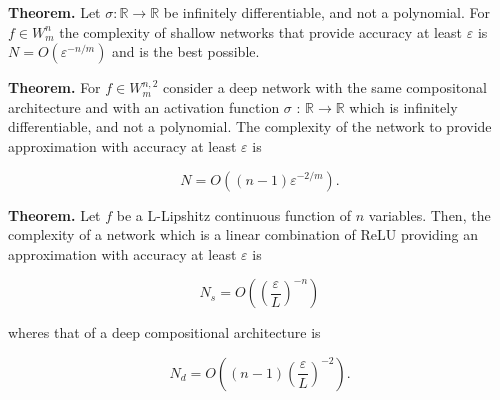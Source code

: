 \textbf{Theorem.} Let $\sigma: \mathbb{R} \rightarrow \mathbb{R}$ be infinitely differentiable, and not a polynomial. For $f \in W_m^n$ the complexity of shallow networks that provide accuracy at least $\varepsilon$ is
$N=O\left(\varepsilon^{-n / m}\right)$ and is the best possible.

\textbf{Theorem.} For $f \in W_m^{n, 2}$ consider a deep network with the same compositonal architecture and with an activation function $\sigma$ : $\mathbb{R} \rightarrow \mathbb{R}$ which is infinitely differentiable, and not a polynomial. The complexity of the network to provide approximation with accuracy at least $\varepsilon$ is

\begin{equation}
N=O\left((n-1) \varepsilon^{-2 / m}\right) .
\end{equation}

\textbf{Theorem.} Let $f$ be a L-Lipshitz continuous function of $n$ variables. Then, the complexity of a network which is a linear combination of ReLU providing an approximation with accuracy at least $\varepsilon$ is

$$
N_s=O\left(\left(\frac{\varepsilon}{L}\right)^{-n}\right)
$$

wheres that of a deep compositional architecture is

$$
N_d=O\left((n-1)\left(\frac{\varepsilon}{L}\right)^{-2}\right) .
$$

